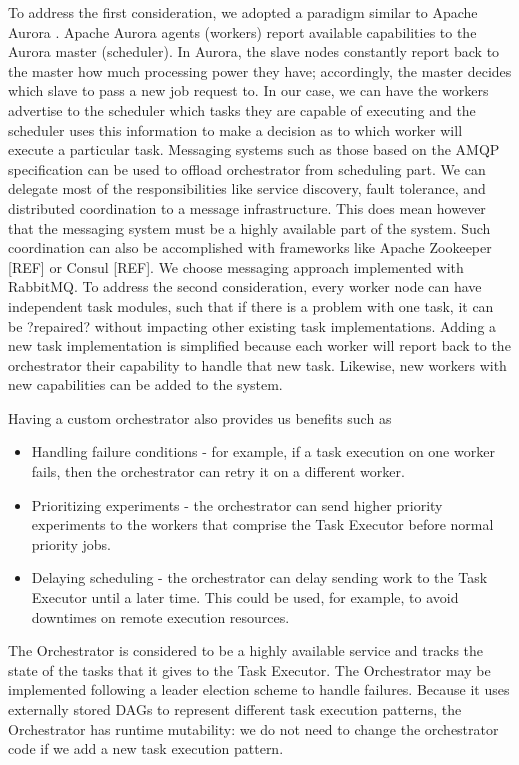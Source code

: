 \documentclass[review]{elsarticle}
\begin{document}
To address the first consideration, we adopted a paradigm similar to Apache Aurora \cite{apacheAurora}.  Apache Aurora agents (workers) report available capabilities to the Aurora master (scheduler). In Aurora, the slave nodes constantly report back to the master how much processing power they have; accordingly, the master decides which slave to pass a new job request to. In our case, we can have the workers advertise to the scheduler which tasks they are capable of executing and the scheduler uses this information to make a decision as to which worker will execute a particular task.
Messaging systems such as those based on the AMQP specification can be used to offload orchestrator from scheduling part. We can delegate most of the responsibilities like service discovery, fault tolerance, and distributed coordination to a message infrastructure. This does mean however that the messaging system must be a highly available part of the system. Such coordination can also be accomplished with  frameworks like Apache Zookeeper [REF] or Consul [REF]. We choose messaging approach implemented with RabbitMQ. 
To address the second consideration, every worker node can have independent task modules, such that if there is a problem with one task, it can be ?repaired? without impacting other existing task implementations. Adding a new task implementation is simplified because each worker will report back to the orchestrator their capability to handle that new task. Likewise, new workers with new capabilities can be added to the system.  

Having a custom orchestrator also provides us benefits such as
\begin{itemize}
\item Handling failure conditions - for example, if a task execution on one worker fails, then the orchestrator can retry it on a different worker.
\item Prioritizing experiments - the orchestrator can send higher priority experiments to the workers that comprise the Task Executor before normal priority jobs.  
\item Delaying scheduling - the orchestrator can delay sending work to the Task Executor until a later time.   This could be used, for example, to avoid downtimes on remote execution resources. 
\end{itemize}

The Orchestrator is considered to be a highly available service and tracks the state of the tasks that it gives to the Task Executor.  The Orchestrator may be implemented following a leader election scheme to handle failures.  Because it uses externally stored DAGs to represent different task execution patterns, the Orchestrator has runtime mutability: we do not need to change the orchestrator code if we add a new task execution pattern. 
\end{document}
